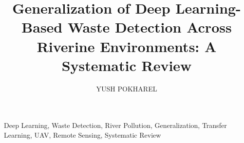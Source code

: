 \documentclass{ieeeaccess}
\begin{document}
\doi{-}

\title{Generalization of Deep Learning-Based Waste Detection Across Riverine Environments: A Systematic Review}
\author{\uppercase{Yush Pokharel}}
\address[1]{Affiliation To Be Confirmed}

\begin{keywords}
Deep Learning, Waste Detection, River Pollution, Generalization, Transfer Learning, UAV, Remote Sensing, Systematic Review
\end{keywords}



\maketitle
















\EOD
\end{document}
